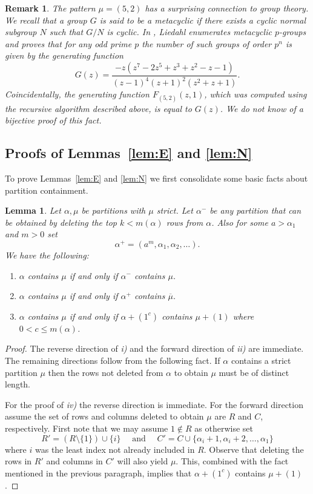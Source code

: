 \documentclass{article}
\theoremstyle{plain}
\newtheorem{lemma}[theorem]{Lemma}
\newtheorem{remark}[theorem]{Remark}
\theoremstyle{definition}
\renewcommand{\ne}[1]{\overline{#1}}
\begin{document}
\begin{remark}\label{rmk:metacyclic}
The pattern $\mu = (5,2)$ has a surprising connection to group theory.  We recall that a group $G$ is said to be a metacyclic if there exists a cyclic normal subgroup $N$ such that $G/N$ is cyclic.  In \cite{Liedahl:Enume1996}, Liedahl enumerates metacyclic $p$-groups and proves that for any odd prime $p$ the number of such groups of order $p^n$ is given by the generating function
$$G(z) = \frac{-z(z^7 - 2z^5 + z^3 + z^2 - z - 1)}{(z - 1)^4(z + 1)^2(z^2 + z + 1)}.$$
Coincidentally, the generating function $F_{(5,2)}(z,1)$, which was computed using the  recursive algorithm described above, is equal to $G(z)$.   We do not know of a bijective proof of this fact.
\end{remark}


\subsection{Proofs of Lemmas~\ref{lem:E} and \ref{lem:N}}\label{sec:lemmas 1 and 2}

To prove Lemmas~\ref{lem:E} and \ref{lem:N} we first consolidate some basic facts about partition containment.   

\begin{lemma}\label{lem:list of prop}
Let $\alpha,\mu$ be partitions with $\mu$ strict.  Let $\alpha^-$ be any partition that can be obtained by deleting the top $k<m(\alpha)$ rows from $\alpha$.  Also for some $a>\alpha_1$ and $m>0$ set
$$\alpha^+ = (a^m, \alpha_1,\alpha_2,\ldots).$$
We have the following:
\begin{enumerate}[label=\roman*)]
	\item $\alpha$  contains $\mu$ if and only if $\alpha^-$ contains $\mu$.
	\item $\alpha$ contains $\mu$ if and only if $\alpha^+$ contains $\ne\mu$.
	\item $\alpha$ contains $\mu$ if and only if $\alpha+(1^c)$ contains $\mu+(1)$ where $0<c\leq m(\alpha)$.  
\end{enumerate}
\end{lemma}

\begin{proof}
The reverse direction of \emph{i)} and the forward direction of \emph{ii)} are immediate.  The remaining directions follow from the following fact.  If $\alpha$ contains a strict partition $\mu$ then the rows not deleted from $\alpha$ to obtain $\mu$ must be of distinct length.  

For the proof of \emph{iv)} the reverse direction is immediate.  For the forward direction assume the set of rows and columns deleted to obtain $\mu$ are $R$ and $C$, respectively.  First note that we may assume $1\notin R$ as otherwise set
$$R'= (R \setminus \{1\}) \cup \{i\} \quad\textrm{ and }\quad C'=C\cup \{\alpha_i+1,\alpha_i+2,\ldots, \alpha_1\}$$
where $i$ was the least index not already included in $R$. 
Observe that deleting the rows in $R'$ and columns in $C'$ will also yield $\mu$.  This, combined with the fact mentioned in the previous paragraph, implies that $\alpha+(1^c)$ contains $\mu+(1)$.
\end{proof}
\end{document}
